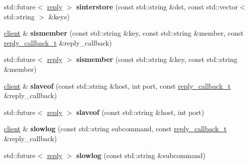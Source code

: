\begin{DoxyCompactItemize}
\item 
\mbox{\label{classcpp__redis_1_1client_aa105a26578624af221f16675c0fbfc55}} 
std\+::future$<$ \hyperlink{classcpp__redis_1_1reply}{reply} $>$ {\bfseries sinterstore} (const std\+::string \&dst, const std\+::vector$<$ std\+::string $>$ \&keys)
\item 
\mbox{\label{classcpp__redis_1_1client_a369fb068437dfb3f63091d031174cc19}} 
\hyperlink{classcpp__redis_1_1client}{client} \& {\bfseries sismember} (const std\+::string \&key, const std\+::string \&member, const \hyperlink{classcpp__redis_1_1client_a061a1140d36d2eaeda82b09a0bb3f9f2}{reply\+\_\+callback\+\_\+t} \&reply\+\_\+callback)
\item 
\mbox{\label{classcpp__redis_1_1client_af4ba6bfa37b81759324c726ef77acdbc}} 
std\+::future$<$ \hyperlink{classcpp__redis_1_1reply}{reply} $>$ {\bfseries sismember} (const std\+::string \&key, const std\+::string \&member)
\item 
\mbox{\label{classcpp__redis_1_1client_a5a8ff87da211196ca80a7c4badb0c378}} 
\hyperlink{classcpp__redis_1_1client}{client} \& {\bfseries slaveof} (const std\+::string \&host, int port, const \hyperlink{classcpp__redis_1_1client_a061a1140d36d2eaeda82b09a0bb3f9f2}{reply\+\_\+callback\+\_\+t} \&reply\+\_\+callback)
\item 
\mbox{\label{classcpp__redis_1_1client_a1731c94f72a209ffcba25767b8cab386}} 
std\+::future$<$ \hyperlink{classcpp__redis_1_1reply}{reply} $>$ {\bfseries slaveof} (const std\+::string \&host, int port)
\item 
\mbox{\label{classcpp__redis_1_1client_a2b9fce6f9d5c9ea1038a1c4b43b16a6d}} 
\hyperlink{classcpp__redis_1_1client}{client} \& {\bfseries slowlog} (const std\+::string subcommand, const \hyperlink{classcpp__redis_1_1client_a061a1140d36d2eaeda82b09a0bb3f9f2}{reply\+\_\+callback\+\_\+t} \&reply\+\_\+callback)
\item 
\mbox{\label{classcpp__redis_1_1client_a73f52f578ac8f266eb6e2b1f2a9cfdff}} 
std\+::future$<$ \hyperlink{classcpp__redis_1_1reply}{reply} $>$ {\bfseries slowlog} (const std\+::string \&subcommand)

\end{DoxyCompactItemize}
